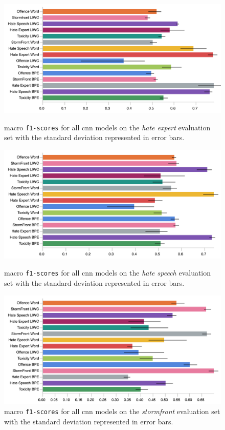\begin{figure}
\begin{minipage}{\textwidth}
\centering
    \includegraphics[width=\textwidth]{all_cnn_waseem_test.pdf}
    \caption{macro \texttt{f1-scores} for all cnn models on the \textit{hate expert} evaluation set with the standard deviation represented in error bars.}
    \label{fig:waseem_cnn_test}
    \vfill
    \includegraphics[width=\textwidth]{all_cnn_waseem_hovy_test.pdf}
    \caption{macro \texttt{f1-scores} for all cnn models on the \textit{hate speech} evaluation set with the standard deviation represented in error bars.}
  \label{fig:waseem_hovy_cnn_test}
\end{minipage}
\end{figure}

\begin{figure}
    \centering
    \includegraphics[width=\textwidth]{all_cnn_garcia_test.pdf}
  \caption{macro \texttt{f1-scores} for all cnn models on the \textit{stormfront} evaluation set with the standard deviation represented in error bars.}
  \label{fig:garcia_cnn_test}
\end{figure}

